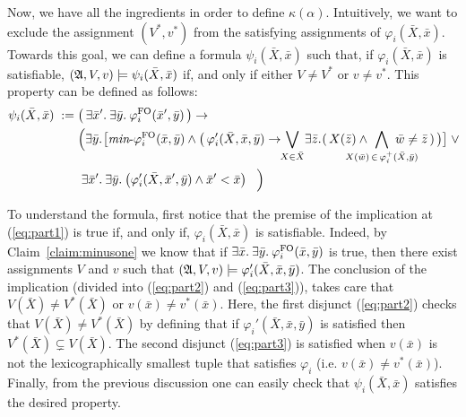 Now, we have all the ingredients in order to define $\kappa(\alpha)$. 
Intuitively, we want to exclude the assignment $(V^*, v^*)$ from the satisfying assignments of $\varphi_i(\bar{X},\bar{x})$.
Towards this goal, we can define a formula $\psi_i(\bar{X},\bar{x})$ such that, if $\varphi_i(\bar{X}, \bar{x})$ is satisfiable, $(\mathfrak{A}, V, v) \models \psi_i(\bar{X},\bar{x})$ if, and only if either $V \neq V^*$ or $v \neq v^*$. 
This property can be defined as follows:
\begin{align}
\psi_i(\bar{X},\bar{x}) \; := \;  &\big( \, \ex{\bar{x}'} \ex{\bar{y}} \varphi^{\fo}_i(\bar{x}',\bar{y}) \,\big) \rightarrow  \label{eq:part1} \\
&\Big( 
\ex{\bar{y}}\!\big[ \text{{\it min}-}\varphi^{\fo}_i(\bar{x}, \bar{y}) \wedge \big( \, \varphi_i'(\bar{X},\bar{x}, \bar{y})  \rightarrow \!\! \bigvee_{X \in \bar{X}}\! \ex{\bar{z}}\!( \, X(\bar{z}) \wedge   \!\!\!\!\!\!\!\!\!\!\!\! \bigwedge\limits_{X(\bar{w}) \, \in \, \varphi^{+}_i(\bar{X},\bar{y})} \!\!\!\!\!\!\!\!\!\!\!\! \bar{w}\neq\bar{z} \, ) \, \big)\big] \;  \vee \!  \label{eq:part2} \\ 
&\; \ex{\bar{x}'} \ex{\bar{y}}\big( \varphi_i'(\bar{X},\bar{x}',\bar{y})\wedge \bar{x}' < \bar{x}\big) \; \;\; \Big)  \label{eq:part3}
\end{align}

To understand the formula, first notice that the premise of the implication at (\ref{eq:part1}) is true if, and only if, $\varphi_i(\bar{X}, \bar{x})$ is satisfiable. 
Indeed, by Claim~\ref{claim:minusone} we know that if $\exists{\bar{x}}.\: \exists{\bar{y}}.\: \varphi^{{\rm FO}}_i(\bar{x},\bar{y})$ is true, then there exist assignments $V$ and $v$ such that $(\mathfrak{A},V,v) \models\varphi_i'(\bar{X},\bar{x},\bar{y})$.
The conclusion of the implication (divided into (\ref{eq:part2}) and (\ref{eq:part3})), takes care that $V(\bar{X}) \neq V^*(\bar{X})$ or $v(\bar{x}) \neq v^*(\bar{x})$.
Here, the first disjunct (\ref{eq:part2}) checks that $V(\bar{X}) \neq V^*(\bar{X})$ by defining that if $\varphi_i'(\bar{X},\bar{x}, \bar{y})$ is satisfied then $V^*(\bar{X}) \subsetneq V(\bar{X})$. 
The second disjunct (\ref{eq:part3}) is satisfied when $v(\bar{x})$ is not the lexicographically smallest tuple that satisfies $\varphi_i$ (i.e. $v(\bar{x}) \neq v^*(\bar{x})$).
Finally, from the previous discussion one can easily check that $\psi_i(\bar{X},\bar{x})$ satisfies the desired property.


